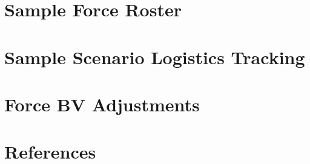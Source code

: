 \documentclass{article}
\begin{document}
\section{Sample Force Roster}



\newpage

\section{Sample Scenario Logistics Tracking}



\newpage

\section{Force BV Adjustments}
\label{sec:force_bv_adjustments}



\newpage

\section{References}



\newpage
\end{document}
